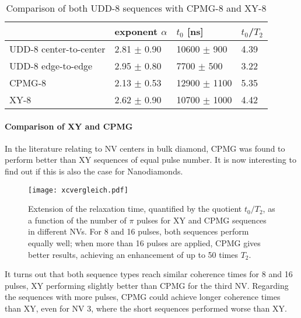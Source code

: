 \documentclass[12pt,a4paper]{article}
\begin{document}
\begin{table}[H]
\centering
\caption{Comparison of both UDD-8 sequences with CPMG-8 and XY-8}
\label{U8t}
\begin{tabular}{l|ll|l}
& exponent $\alpha$ & $t_0$   {[}ns{]}                                                   & $t_0$/$T_2$              \\\hline
UDD-8 center-to-center       & 2.81           $\pm$ 0.90 & 10600          $\pm$ 900        & 4.39 \\
UDD-8 edge-to-edge       & 2.95          $\pm$ 0.80  & 7700          $\pm$ 500        & 3.22\\
CPMG-8          & 2.13          $\pm$ 0.53 & 12900            $\pm$ 1100         & 5.35 \\
XY-8            & 2.62          $\pm$ 0.90 & 10700          $\pm$ 1000          & 4.42       
\end{tabular}
\end{table}

\paragraph{Comparison of XY and CPMG}
In the literature relating to NV centers in bulk diamond, CPMG was found to perform better than XY sequences of equal pulse number\cite{dd}. It is now interesting to find out if this is also the case for Nanodiamonds.
\begin{figure}[H] 
\texttt{[image: xcvergleich.pdf]} 
\caption{Extension of the relaxation time, quantified by the quotient $t_0/T_2$, as a function of the number of $\pi$ pulses for XY and CPMG sequences in different NVs. For 8 and 16 pulses, both sequences perform equally well; when more than 16 pulses are applied, CPMG gives better results, achieving an enhancement of up to 50 times $T_2$.}
\label{xc}
\end{figure}
It turns out that both sequence types reach similar coherence times for 8 and 16 pulses, XY performing slightly better than CPMG for the third NV. Regarding the sequences with more pulses, CPMG could achieve longer coherence times than XY, even for NV 3, where the short sequences performed worse than XY.
\end{document}
